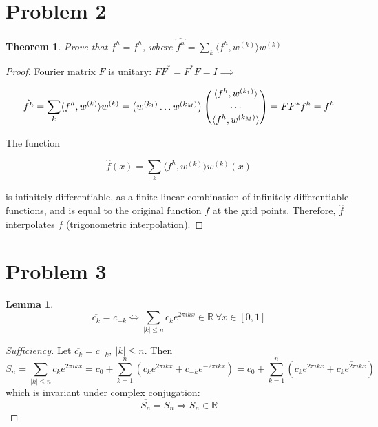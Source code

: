 \documentclass[a4paper]{amsproc}
\theoremstyle{plain}
\newtheorem*{thm}{Theorem}
\newtheorem{lem}{Lemma}[section]
\theoremstyle{definition}
\theoremstyle{remark}
\numberwithin{equation}{section}
\providecommand{\F}{\begin{pmatrix} w^{(k_1)} \hdots w^{(k_M)} \end{pmatrix}}
\providecommand{\fourier}{\begin{pmatrix} \langle f^h, w^{(k_1)} \rangle \\ \hdots \vspace{1mm} \\ \langle f^h, w^{(k_M)} \rangle \end{pmatrix}}
\begin{document}
\section*{Problem 2}

\begin{thm} \label{some label} 
Prove that $\hat{f^h} = f^h$, where $\hat{f^h} = \sum\limits_{k} \langle f^h, w^{(k)} \rangle w^{(k)}$
\end{thm}

\begin{proof}

Fourier matrix $F$ is unitary: $FF^{*} = F^{*}F = I \implies$

\begin{equation}\label{eq:2.1}  
\hat{f^h} = \sum\limits_{k} \langle f^h, w^{(k)} \rangle w^{(k)} = \F \fourier = FF^* f^h = f^h 
\end{equation}

The function

\begin{equation}\label{eq:2.2}  
\hat{f}(x) = \sum\limits_{k} \langle f^h, w^{(k)} \rangle w^{(k)}(x)
\end{equation}

is infinitely differentiable, as a finite linear combination of infinitely differentiable functions, and is equal to the original function $f$ at the grid points. Therefore, $\hat{f}$ interpolates $f$ (trigonometric interpolation).

\end{proof}

\section*{Problem 3}

\begin{lem} \label{some label}
$$ \overline{c_k} = c_{-k} \Longleftrightarrow \sum\limits_{\lvert k \rvert \leq n} c_k e^{2 \pi i k x} \in \mathbb{R}~ \forall x \in [0,1]$$
\end{lem}

\begin{proof}[Sufficiency] 
Let $\overline{c_k} = c_{-k},~ \lvert k \rvert \leq n$. Then
$$ S_n = \sum\limits_{\lvert k \rvert \leq n} c_k e^{2 \pi i k x} = c_0 + \sum\limits_{k = 1}^{n} ( c_k e^{2 \pi i k x} + c_{-k} e^{- 2 \pi i k x} ) = c_0 + \sum\limits_{k = 1}^{n} ( c_k e^{2 \pi i k x} + \overline{c_k e^{2 \pi i k x}} )$$ which is invariant under complex conjugation: $$\overline{S_n} = S_n \Longrightarrow S_n \in \mathbb{R}$$
\end{proof}
\end{document}
